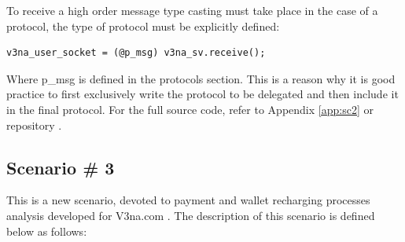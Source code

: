 To receive a high order message type casting must take place in the case of a protocol, the type of protocol must be explicitly defined:

\begin{lstlisting}
v3na_user_socket = (@p_msg) v3na_sv.receive();
\end{lstlisting}

Where p\_msg is defined in the protocols section. This is a reason why it is good practice to first exclusively write the protocol to be delegated and then include it in the final protocol. For the full source code, refer to Appendix \ref{app:sc2} or repository \cite{thesis}.

\subsection{Scenario \# 3}

This is a new scenario, devoted to payment and wallet recharging processes analysis developed for V3na.com \cite{v3na}. The description of this scenario is defined below as follows:

